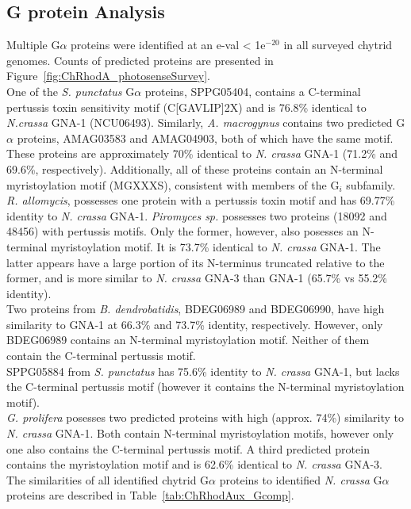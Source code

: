 \subsection*{G protein Analysis}
Multiple G$\alpha$ proteins were identified at an e-val < 1e$^{-20}$ in all surveyed chytrid genomes. Counts of predicted proteins are presented in Figure~\ref{fig:ChRhodA_photosenseSurvey}.\\
\indent One of the \textit{S. punctatus} G$\alpha$ proteins, SPPG05404, contains a C-terminal pertussis toxin sensitivity motif (C[GAVLIP]{2}X) and is 76.8\% identical to \textit{N.crassa} GNA-1 (NCU06493). Similarly, \textit{A. macrogynus} contains two predicted G$\alpha$ proteins, AMAG03583 and AMAG04903, both of which have the same motif. These proteins are approximately 70\% identical to \textit{N. crassa} GNA-1 (71.2\% and 69.6\%, respectively). Additionally, all of these proteins contain an N-terminal myristoylation motif (MGXXXS), consistent with members of the G$_{i}$ subfamily. \textit{R. allomycis}, possesses one protein with a pertussis toxin motif and has 69.77\% identity to \textit{N. crassa} GNA-1. \textit{Piromyces sp.} possesses two proteins (18092 and 48456) with pertussis motifs. Only the former, however, also posesses an N-terminal myristoylation motif. It is 73.7\% identical to \textit{N. crassa} GNA-1. The latter appears have a large portion of its N-terminus truncated relative to the former, and is more similar to \textit{N. crassa} GNA-3 than GNA-1 (65.7\% vs 55.2\% identity).\\
\indent Two proteins from \textit{B. dendrobatidis}, BDEG06989 and BDEG06990, have high similarity to GNA-1 at 66.3\% and 73.7\% identity, respectively. However, only BDEG06989 contains an N-terminal myristoylation motif. Neither of them contain the C-terminal pertussis motif.\\
\indent SPPG05884 from \textit{S. punctatus} has 75.6\% identity to \textit{N. crassa} GNA-1, but lacks the C-terminal pertussis motif (however it contains the N-terminal myristoylation motif).\\
\indent \textit{G. prolifera} posesses two predicted proteins with high (approx. 74\%) similarity to \textit{N. crassa} GNA-1. Both contain N-terminal myristoylation motifs, however only one also contains the C-terminal pertussis motif. A third predicted protein contains the myristoylation motif and is 62.6\% identical to \textit{N. crassa} GNA-3.\\
\indent The similarities of all identified chytrid G$\alpha$ proteins to identified \textit{N. crassa} G$\alpha$ proteins are described in Table~\ref{tab:ChRhodAux_Gcomp}.\\
